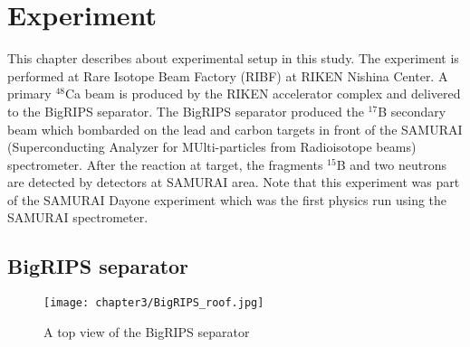 \chapter{Experiment}
    This chapter describes about experimental setup in this study. The experiment is performed at Rare Isotope Beam Factory (RIBF) at RIKEN Nishina Center.\cite{RIKEN} A primary ${}^{48}$Ca beam is produced by the RIKEN accelerator complex and delivered to the BigRIPS separator. \cite{BigRIPS} The BigRIPS separator produced the ${}^{17}$B secondary beam which bombarded on the lead and carbon targets in front of the SAMURAI (Superconducting Analyzer for MUlti-particles from Radioisotope beams) spectrometer. \cite{SAMURAI} After the reaction at target, the fragments ${}^{15}$B and two neutrons are detected by detectors at SAMURAI area. Note that this experiment was part of the SAMURAI Dayone experiment which was the first physics run using the SAMURAI spectrometer.

\section{BigRIPS separator}

    \begin{figure}
        \centering
        \texttt{[image: chapter3/BigRIPS\_roof.jpg]}
        \caption{A top view of the BigRIPS separator}
    \end{figure} 

